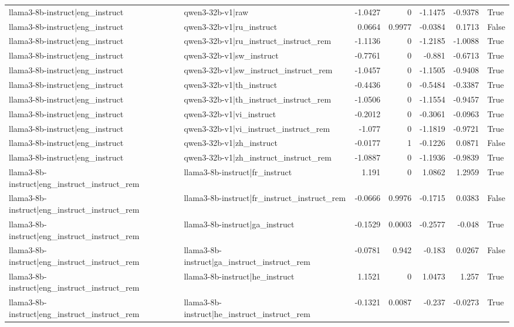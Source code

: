 \begin{table}
\begin{tabular}{l l r r r r l}
llama3-8b-instruct|eng_instruct & qwen3-32b-v1|raw & -1.0427 & 0 & -1.1475 & -0.9378 & True \\
llama3-8b-instruct|eng_instruct & qwen3-32b-v1|ru_instruct & 0.0664 & 0.9977 & -0.0384 & 0.1713 & False \\
llama3-8b-instruct|eng_instruct & qwen3-32b-v1|ru_instruct_instruct_rem & -1.1136 & 0 & -1.2185 & -1.0088 & True \\
llama3-8b-instruct|eng_instruct & qwen3-32b-v1|sw_instruct & -0.7761 & 0 & -0.881 & -0.6713 & True \\
llama3-8b-instruct|eng_instruct & qwen3-32b-v1|sw_instruct_instruct_rem & -1.0457 & 0 & -1.1505 & -0.9408 & True \\
llama3-8b-instruct|eng_instruct & qwen3-32b-v1|th_instruct & -0.4436 & 0 & -0.5484 & -0.3387 & True \\
llama3-8b-instruct|eng_instruct & qwen3-32b-v1|th_instruct_instruct_rem & -1.0506 & 0 & -1.1554 & -0.9457 & True \\
llama3-8b-instruct|eng_instruct & qwen3-32b-v1|vi_instruct & -0.2012 & 0 & -0.3061 & -0.0963 & True \\
llama3-8b-instruct|eng_instruct & qwen3-32b-v1|vi_instruct_instruct_rem & -1.077 & 0 & -1.1819 & -0.9721 & True \\
llama3-8b-instruct|eng_instruct & qwen3-32b-v1|zh_instruct & -0.0177 & 1 & -0.1226 & 0.0871 & False \\
llama3-8b-instruct|eng_instruct & qwen3-32b-v1|zh_instruct_instruct_rem & -1.0887 & 0 & -1.1936 & -0.9839 & True \\
llama3-8b-instruct|eng_instruct_instruct_rem & llama3-8b-instruct|fr_instruct & 1.191 & 0 & 1.0862 & 1.2959 & True \\
llama3-8b-instruct|eng_instruct_instruct_rem & llama3-8b-instruct|fr_instruct_instruct_rem & -0.0666 & 0.9976 & -0.1715 & 0.0383 & False \\
llama3-8b-instruct|eng_instruct_instruct_rem & llama3-8b-instruct|ga_instruct & -0.1529 & 0.0003 & -0.2577 & -0.048 & True \\
llama3-8b-instruct|eng_instruct_instruct_rem & llama3-8b-instruct|ga_instruct_instruct_rem & -0.0781 & 0.942 & -0.183 & 0.0267 & False \\
llama3-8b-instruct|eng_instruct_instruct_rem & llama3-8b-instruct|he_instruct & 1.1521 & 0 & 1.0473 & 1.257 & True \\
llama3-8b-instruct|eng_instruct_instruct_rem & llama3-8b-instruct|he_instruct_instruct_rem & -0.1321 & 0.0087 & -0.237 & -0.0273 & True \\

\end{tabular}
\end{table}
